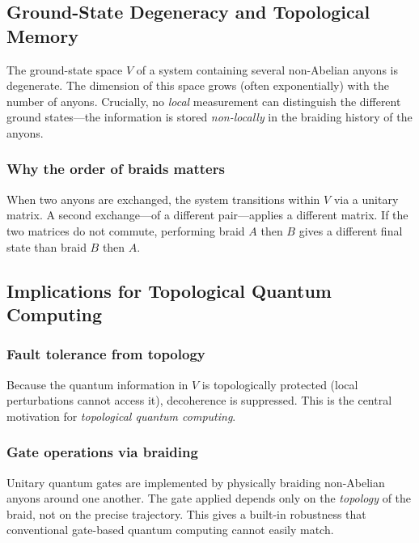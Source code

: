 \documentclass[11pt,a4paper]{article}
\begin{document}
\subsection{Ground-State Degeneracy and Topological Memory}

The ground-state space $V$ of a system containing several non-Abelian anyons
is degenerate.  The dimension of this space grows (often exponentially) with
the number of anyons.  Crucially, no \emph{local} measurement can distinguish
the different ground states---the information is stored \emph{non-locally} in
the braiding history of the anyons.

\subsubsection{Why the order of braids matters}

When two anyons are exchanged, the system transitions within $V$ via a unitary
matrix.  A second exchange---of a different pair---applies a different matrix.
If the two matrices do not commute, performing braid $A$ then $B$ gives a
different final state than braid $B$ then $A$.

\subsection{Implications for Topological Quantum Computing}

\subsubsection{Fault tolerance from topology}

Because the quantum information in $V$ is topologically protected (local
perturbations cannot access it), decoherence is suppressed.  This is the
central motivation for \emph{topological quantum computing}.

\subsubsection{Gate operations via braiding}

Unitary quantum gates are implemented by physically braiding non-Abelian
anyons around one another.  The gate applied depends only on the \emph{topology}
of the braid, not on the precise trajectory.  This gives a built-in robustness
that conventional gate-based quantum computing cannot easily match.
\end{document}
